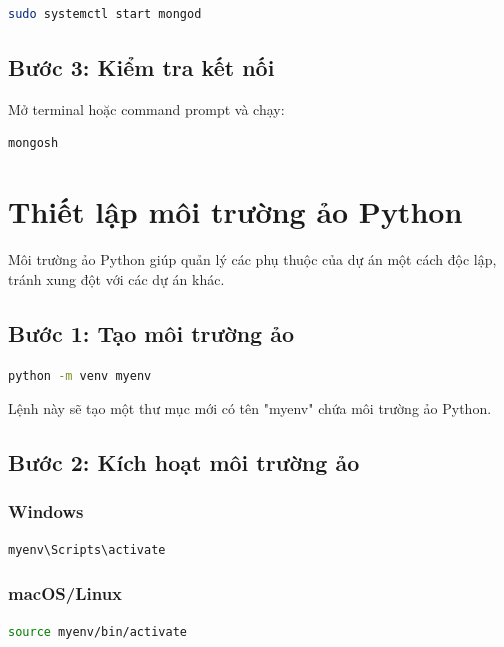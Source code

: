 \begin{lstlisting}[language=bash]
sudo systemctl start mongod
\end{lstlisting}

\subsection{Bước 3: Kiểm tra kết nối}

Mở terminal hoặc command prompt và chạy:

\begin{lstlisting}[language=bash]
mongosh
\end{lstlisting}


\section{Thiết lập môi trường ảo Python}

Môi trường ảo Python giúp quản lý các phụ thuộc của dự án một cách độc lập, tránh xung đột với các dự án khác.

\subsection{Bước 1: Tạo môi trường ảo}

\begin{lstlisting}[language=bash]
python -m venv myenv
\end{lstlisting}

Lệnh này sẽ tạo một thư mục mới có tên "myenv" chứa môi trường ảo Python.

\subsection{Bước 2: Kích hoạt môi trường ảo}

\subsubsection{Windows}
\begin{lstlisting}[language=bash]
myenv\Scripts\activate
\end{lstlisting}

\subsubsection{macOS/Linux}
\begin{lstlisting}[language=bash]
source myenv/bin/activate
\end{lstlisting}

